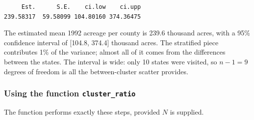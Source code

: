 \documentclass[
  letterpaper,
  DIV=11,
  numbers=noendperiod]{scrreprt}
\newenvironment{Shaded}{\begin{snugshade}}{\end{snugshade}}
\newcommand{\AttributeTok}[1]{\textcolor[rgb]{0.40,0.45,0.13}{#1}}
\newcommand{\DecValTok}[1]{\textcolor[rgb]{0.68,0.00,0.00}{#1}}
\newcommand{\FunctionTok}[1]{\textcolor[rgb]{0.28,0.35,0.67}{#1}}
\newcommand{\NormalTok}[1]{\textcolor[rgb]{0.00,0.23,0.31}{#1}}
\newcommand{\OtherTok}[1]{\textcolor[rgb]{0.00,0.23,0.31}{#1}}
\newcommand{\SpecialCharTok}[1]{\textcolor[rgb]{0.37,0.37,0.37}{#1}}
\newcommand{\StringTok}[1]{\textcolor[rgb]{0.13,0.47,0.30}{#1}}
\renewcommand{\[}{\begin{equation}}
\renewcommand{\]}{\end{equation}}
\begin{document}
\begin{verbatim}
     Est.      S.E.    ci.low    ci.upp 
239.58317  59.58099 104.80160 374.36475 
\end{verbatim}

The estimated mean 1992 acreage per county is 239.6 thousand acres, with
a 95\% confidence interval of {[}104.8, 374.4{]} thousand acres. The
stratified piece contributes 1\% of the variance; almost all of it comes
from the differences between the states. The interval is wide: only 10
states were visited, so \(n - 1 = 9\) degrees of freedom is all the
between-cluster scatter provides.

\subsubsection*{\texorpdfstring{Using the function
\texttt{cluster\_ratio}}{Using the function cluster\_ratio}}\label{using-the-function-cluster_ratio}

The function performs exactly these steps, provided \(N\) is supplied.

\begin{Shaded}
\end{Shaded}
\end{document}
